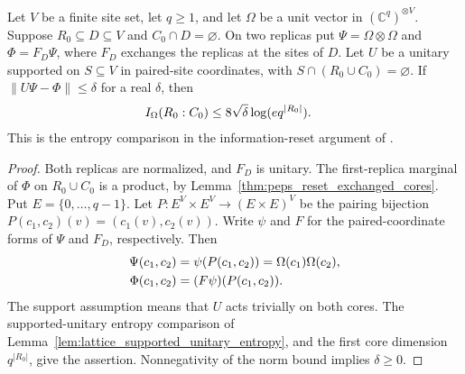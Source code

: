 \begin{lemma}
    \label{thm:regional_reset_cores_entropy}
    \leanok
    Let $V$ be a finite site set, let $q\ge1$, and let $\Omega$ be a unit
    vector in $(\mathbb C^q)^{\otimes V}$. Suppose $R_0\subseteq D\subseteq V$
    and $C_0\cap D=\varnothing$. On two replicas put
    $\Psi=\Omega\otimes\Omega$ and $\Phi=F_D\Psi$, where $F_D$ exchanges
    the replicas at the sites of $D$.
    Let $U$ be a unitary supported on $S\subseteq V$ in paired-site coordinates,
    with $S\cap(R_0\cup C_0)=\varnothing$.
    If $\|U\Psi-\Phi\|\le\delta$ for a real $\delta$, then
    \begin{align}
        I_\Omega(R_0:C_0) & \le8\sqrt\delta\log(e q^{|R_0|}).\notag
    \end{align}
    This is the entropy comparison in the information-reset argument of
    \cite[Part~IIa]{TNLean2026OneDimensional}.
\end{lemma}
\begin{proof}\leanok
    Both replicas are normalized, and $F_D$ is unitary. The first-replica
    marginal of $\Phi$ on $R_0\cup C_0$ is a product, by
    Lemma~\ref{thm:peps_reset_exchanged_cores}.
    Put $E=\{0,\ldots,q-1\}$. Let
    $P:E^V\times E^V\to(E\times E)^V$ be the pairing bijection
    $P(c_1,c_2)(v)=(c_1(v),c_2(v))$. Write $\psi$ and $F$ for the
    paired-coordinate forms of $\Psi$ and $F_D$, respectively. Then
    \begin{align}
        \Psi(c_1,c_2) & =\psi(P(c_1,c_2))=\Omega(c_1)\Omega(c_2),\notag \\
        \Phi(c_1,c_2) & =(F\psi)(P(c_1,c_2)).\notag
    \end{align}
    The support assumption means that $U$ acts trivially on both cores.
    The supported-unitary entropy comparison of
    Lemma~\ref{lem:lattice_supported_unitary_entropy}, and the first core dimension
    $q^{|R_0|}$, give the assertion. Nonnegativity of the norm bound implies
    $\delta\ge0$.
\end{proof}

